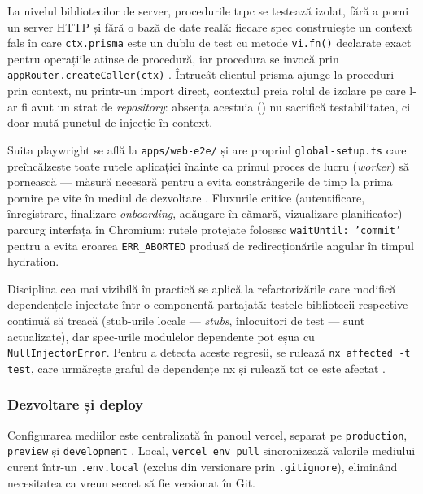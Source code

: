 La nivelul bibliotecilor de server, procedurile \gls{trpc} se testează izolat, fără a porni un server HTTP și fără o bază de date reală: fiecare spec construiește un context fals în care \texttt{ctx.prisma} este un dublu de test cu metode \texttt{vi.fn()} declarate exact pentru operațiile atinse de procedură, iar procedura se invocă prin \texttt{appRouter.createCaller(ctx)} \cite{trpc,vitest}. Întrucât clientul \gls{prisma} ajunge la proceduri prin context, nu printr-un import direct, contextul preia rolul de izolare pe care l-ar fi avut un strat de \textit{repository}: absența acestuia () nu sacrifică testabilitatea, ci doar mută punctul de injecție în context.

Suita \gls{playwright} se află la \texttt{apps/web-e2e/} și are propriul \texttt{global-setup.ts} care preîncălzește toate rutele aplicației înainte ca primul proces de lucru (\textit{worker}) să pornească --- măsură necesară pentru a evita constrângerile de timp la prima pornire pe \gls{vite} în mediul de dezvoltare \cite{playwright}. Fluxurile critice (autentificare, înregistrare, finalizare \textit{onboarding}, adăugare în cămară, vizualizare planificator) parcurg interfața în Chromium; rutele protejate folosesc \texttt{waitUntil: 'commit'} pentru a evita eroarea \texttt{ERR\_ABORTED} produsă de redirecționările \gls{angular} în timpul \gls{hydration}.

Disciplina cea mai vizibilă în practică se aplică la refactorizările care modifică dependențele injectate într-o componentă partajată: testele bibliotecii respective continuă să treacă (stub-urile locale --- \textit{stubs}, înlocuitori de test --- sunt actualizate), dar spec-urile modulelor dependente pot eșua cu \texttt{NullInjectorError}. Pentru a detecta aceste regresii, se rulează \texttt{nx affected -t test}, care urmărește graful de dependențe \gls{nx} și rulează tot ce este afectat \cite{nx}.

\subsubsection{Dezvoltare și deploy}\label{subsec:dezvoltare-deploy}

Configurarea mediilor este centralizată în panoul \gls{vercel}, separat pe \texttt{production}, \texttt{preview} și \texttt{development} \cite{vercel_cli}. Local, \texttt{vercel env pull} sincronizează valorile mediului curent într-un \texttt{.env.local} (exclus din versionare prin \texttt{.gitignore}), eliminând necesitatea ca vreun secret să fie versionat în Git.

